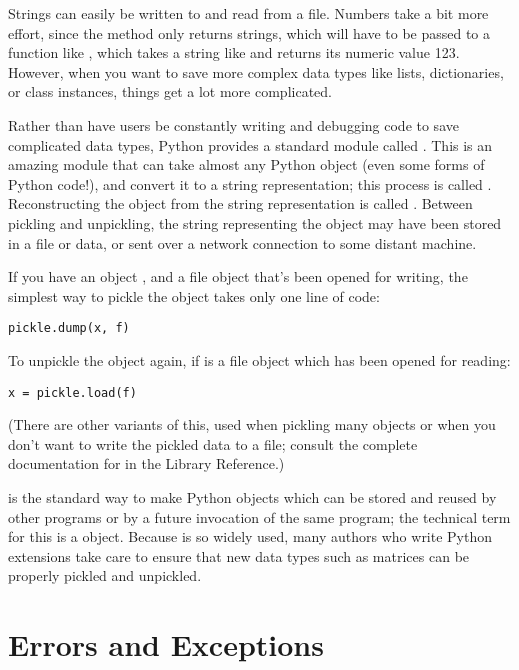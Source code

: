 \documentclass{manual}
\begin{document}
Strings can easily be written to and read from a file. Numbers take a
bit more effort, since the  method only returns
strings, which will have to be passed to a function like
, which takes a string like  and
returns its numeric value 123.  However, when you want to save more
complex data types like lists, dictionaries, or class instances,
things get a lot more complicated.

Rather than have users be constantly writing and debugging code to
save complicated data types, Python provides a standard module called
.  This is an amazing module that can take almost
any Python object (even some forms of Python code!), and convert it to
a string representation; this process is called .  
Reconstructing the object from the string representation is called
.  Between pickling and unpickling, the string
representing the object may have been stored in a file or data, or
sent over a network connection to some distant machine.

If you have an object , and a file object  that's been
opened for writing, the simplest way to pickle the object takes only
one line of code:

\begin{verbatim}
pickle.dump(x, f)
\end{verbatim}

To unpickle the object again, if  is a file object which has
been opened for reading:

\begin{verbatim}
x = pickle.load(f)
\end{verbatim}

(There are other variants of this, used when pickling many objects or
when you don't want to write the pickled data to a file; consult the
complete documentation for  in the Library Reference.)

 is the standard way to make Python objects which can be
stored and reused by other programs or by a future invocation of the
same program; the technical term for this is a 
object.  Because  is so widely used, many authors who
write Python extensions take care to ensure that new data types such
as matrices can be properly pickled and unpickled.



\chapter{Errors and Exceptions}
\label{errors}
\end{document}
